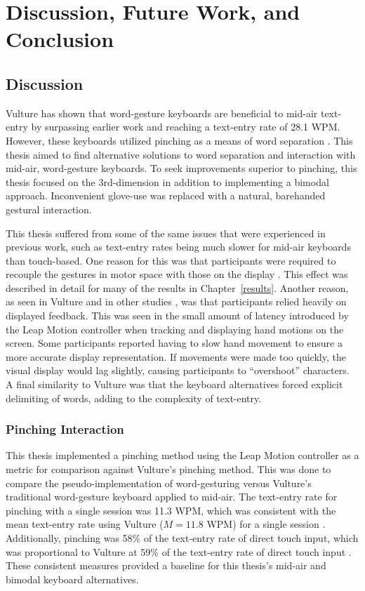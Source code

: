 \chapter{Discussion, Future Work, and Conclusion} \label{conclusion}
\section{Discussion}
Vulture has shown that word-gesture keyboards are beneficial to mid-air text-entry by surpassing earlier work and reaching a text-entry rate of 28.1 WPM. However, these keyboards utilized pinching as a means of word separation \cite{ref_vulture}. This thesis aimed to find alternative solutions to word separation and interaction with mid-air, word-gesture keyboards. To seek improvements superior to pinching, this thesis focused on the 3rd-dimension in addition to implementing a bimodal approach. Inconvenient glove-use was replaced with a natural, barehanded gestural interaction.

This thesis suffered from some of the same issues that were experienced in previous work, such as text-entry rates being much slower for mid-air keyboards than touch-based. One reason for this was that participants were required to recouple the gestures in motor space with those on the display \cite{ref_vulture}. This effect was described in detail for many of the results in Chapter~\ref{results}. Another reason, as seen in Vulture and in other studies \cite{ref_vulture,ref_visual_feedback_focus}, was that participants relied heavily on displayed feedback. This was seen in the small amount of latency introduced by the Leap Motion controller when tracking and displaying hand motions on the screen. Some participants reported having to slow hand movement to ensure a more accurate display representation. If movements were made too quickly, the visual display would lag slightly, causing participants to ``overshoot'' characters. A final similarity to Vulture was that the keyboard alternatives forced explicit delimiting of words, adding to the complexity of text-entry. 

\subsection{Pinching Interaction}
This thesis implemented a pinching method using the Leap Motion controller as a metric for comparison against Vulture's pinching method. This was done to compare the pseudo-implementation of word-gesturing versus Vulture's traditional word-gesture keyboard applied to mid-air. The text-entry rate for pinching with a single session was 11.3 WPM, which was consistent with the mean text-entry rate using Vulture ($M = 11.8$ WPM) for a single session \cite{ref_vulture}. Additionally, pinching was 58\% of the text-entry rate of direct touch input, which was proportional to Vulture at 59\% of the text-entry rate of direct touch input \cite{ref_vulture}. These consistent measures provided a baseline for this thesis's mid-air and bimodal keyboard alternatives.

